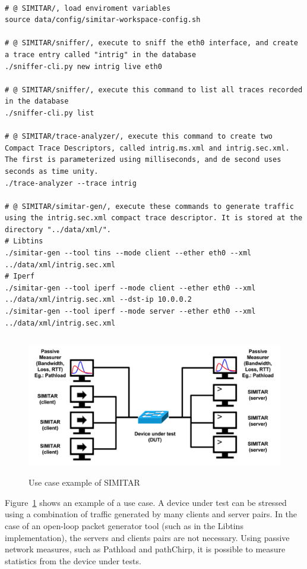 \begin{verbatim}

# @ SIMITAR/, load enviroment variables
source data/config/simitar-workspace-config.sh

# @ SIMITAR/sniffer/, execute to sniff the eth0 interface, and create a trace entry called "intrig" in the database
./sniffer-cli.py new intrig live eth0

# @ SIMITAR/sniffer/, execute this command to list all traces recorded in the database
./sniffer-cli.py list

# @ SIMITAR/trace-analyzer/, execute this command to create two Compact Trace Descriptors, called intrig.ms.xml and intrig.sec.xml. The first is parameterized using milliseconds, and de second uses seconds as time unity.
./trace-analyzer --trace intrig

# @ SIMITAR/simitar-gen/, execute these commands to generate traffic using the intrig.sec.xml compact trace descriptor. It is stored at the directory "../data/xml/". 
# Libtins
./simitar-gen --tool tins --mode client --ether eth0 --xml ../data/xml/intrig.sec.xml 
# Iperf
./simitar-gen --tool iperf --mode client --ether eth0 --xml ../data/xml/intrig.sec.xml --dst-ip 10.0.0.2
./simitar-gen --tool iperf --mode server --ether eth0 --xml ../data/xml/intrig.sec.xml

\end{verbatim}


\begin{figure}[ht!]
    \centering
    \includegraphics[height=2.4in]{figures/ch3/use-case}
    \caption{Use case example of SIMITAR}
    \label{fig:use-case}
\end{figure}



Figure~\ref{fig:use-case} shows an example of a use case. A device under test can be stressed using a combination of traffic generated by many clients and server pairs. In the case of an open-loop packet generator tool (such as in the Libtins implementation), the servers and clients pairs are not necessary. Using passive network measures, such as Pathload and pathChirp\cite{swing-paper}, it is possible to measure statistics from the device under tests.

